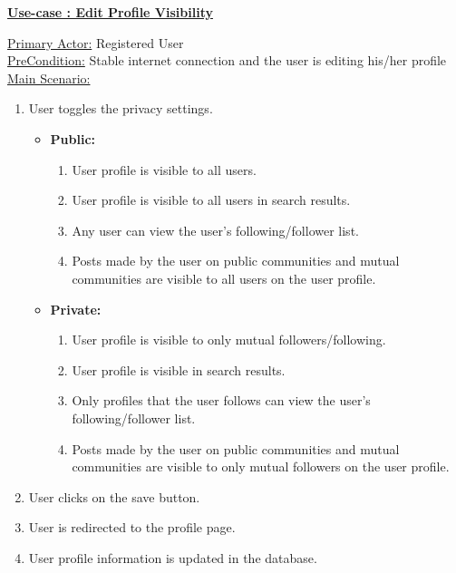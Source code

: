 \documentclass[conference,compsoc]{IEEEtran}
\newcounter{UC}
\newcommand{\nextU}{\stepcounter{UC}\theUC}
\begin{document}
\underline{\textbf{Use-case \nextU: Edit Profile Visibility}}
\vspace{0.2cm}

\underline{Primary Actor:} Registered User\\

\underline{PreCondition:} Stable internet connection and the user is editing his/her profile\\

\underline{Main Scenario:}\\

\begin{enumerate}
    \item User toggles the privacy settings.
          \begin{itemize}
              \item \textbf{Public:}
                    \begin{enumerate}
                        \item User profile is visible to all users.
                        \item User profile is visible to all users in search results.
                        \item Any user can view the user's following/follower list.
                        \item Posts made by the user on public communities and mutual communities are visible to all users on the user profile.
                    \end{enumerate}
              \item \textbf{Private:}
                    \begin{enumerate}
                        \item User profile is visible to only mutual followers/following.
                        \item User profile is visible in search results.
                        \item Only profiles that the user follows can view the user's following/follower list.
                        \item Posts made by the user on public communities and mutual communities are visible to only mutual followers on the user profile.
                    \end{enumerate}
          \end{itemize}
    \item User clicks on the save button.
    \item User is redirected to the profile page.
    \item User profile information is updated in the database.
\end{enumerate}
\end{document}
